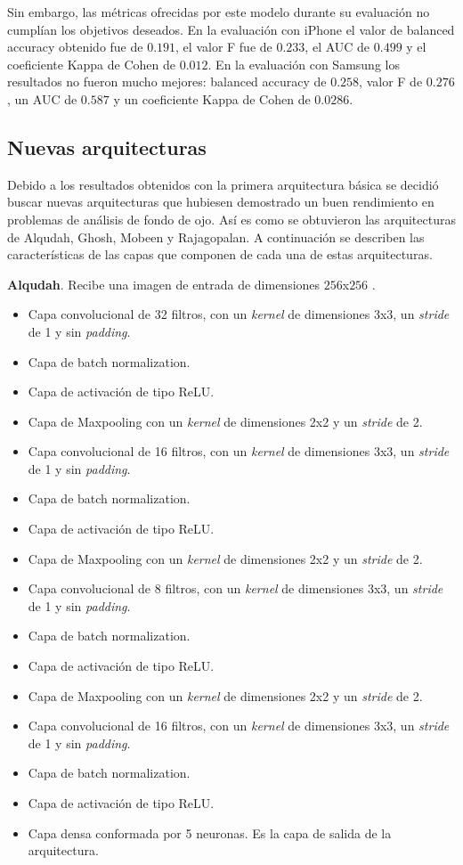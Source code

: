 Sin embargo, las métricas ofrecidas por este modelo durante su evaluación no cumplían los objetivos deseados. En la evaluación con iPhone el valor de balanced accuracy obtenido fue de $0.191$, el valor F fue de $0.233$, el AUC de $0.499$ y el coeficiente Kappa de Cohen de $0.012$. En la evaluación con Samsung los resultados no fueron mucho mejores: balanced accuracy de $0.258$, valor F de $0.276$, un AUC de $0.587$ y un coeficiente Kappa de Cohen de $0.0286$.

\subsection{Nuevas arquitecturas}

Debido a los resultados obtenidos con la primera arquitectura básica se decidió buscar nuevas arquitecturas que hubiesen demostrado un buen rendimiento en problemas de análisis de fondo de ojo. Así es como se obtuvieron las arquitecturas de Alqudah, Ghosh, Mobeen y Rajagopalan. A continuación se describen las características de las capas que componen de cada una de estas arquitecturas.

\textbf{Alqudah}. Recibe una imagen de entrada de dimensiones $256$x$256$ \cite{CNNarch:Alqudah}.
\begin{itemize}
    \item Capa convolucional de 32 filtros, con un \textit{kernel} de dimensiones 3x3, un \textit{stride} de 1 y sin \textit{padding}.
    \item Capa de batch normalization.
    \item Capa de activación de tipo ReLU.
    \item Capa de Maxpooling con un \textit{kernel} de dimensiones 2x2 y un \textit{stride} de 2.
    \item Capa convolucional de 16 filtros, con un \textit{kernel} de dimensiones 3x3, un \textit{stride} de 1 y sin \textit{padding}.
    \item Capa de batch normalization.
    \item Capa de activación de tipo ReLU.
    \item Capa de Maxpooling con un \textit{kernel} de dimensiones 2x2 y un \textit{stride} de 2. 
    \item Capa convolucional de 8 filtros, con un \textit{kernel} de dimensiones 3x3, un \textit{stride} de 1 y sin \textit{padding}.
    \item Capa de batch normalization.
    \item Capa de activación de tipo ReLU.
    \item Capa de Maxpooling con un \textit{kernel} de dimensiones 2x2 y un \textit{stride} de 2. 
    \item Capa convolucional de 16 filtros, con un \textit{kernel} de dimensiones 3x3, un \textit{stride} de 1 y sin \textit{padding}.
    \item Capa de batch normalization.
    \item Capa de activación de tipo ReLU.
     \item Capa densa conformada por 5 neuronas. Es la capa de salida de la arquitectura.
\end{itemize}

